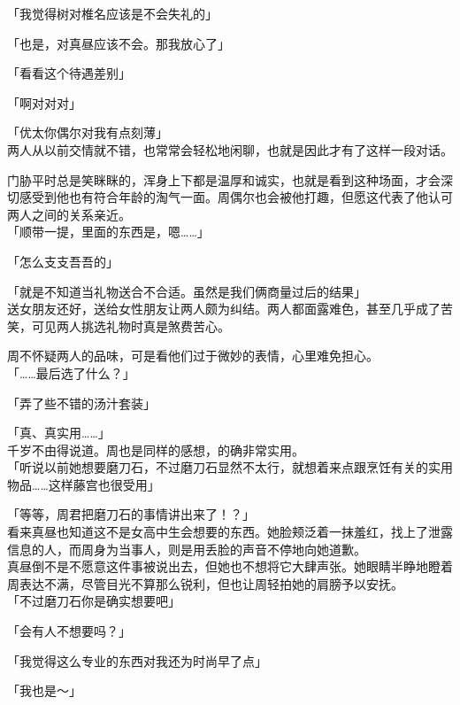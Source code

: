 「我觉得树对椎名应该是不会失礼的」

「也是，对真昼应该不会。那我放心了」

「看看这个待遇差别」

「啊对对对」

「优太你偶尔对我有点刻薄」\\

两人从以前交情就不错，也常常会轻松地闲聊，也就是因此才有了这样一段对话。

门胁平时总是笑眯眯的，浑身上下都是温厚和诚实，也就是看到这种场面，才会深切感受到他也有符合年龄的淘气一面。周偶尔也会被他打趣，但愿这代表了他认可两人之间的关系亲近。\\

「顺带一提，里面的东西是，嗯……」

「怎么支支吾吾的」

「就是不知道当礼物送合不合适。虽然是我们俩商量过后的结果」\\

送女朋友还好，送给女性朋友让两人颇为纠结。两人都面露难色，甚至几乎成了苦笑，可见两人挑选礼物时真是煞费苦心。

周不怀疑两人的品味，可是看他们过于微妙的表情，心里难免担心。\\

「……最后选了什么？」

「弄了些不错的汤汁套装」

「真、真实用……」\\

千岁不由得说道。周也是同样的感想，的确非常实用。\\

「听说以前她想要磨刀石，不过磨刀石显然不太行，就想着来点跟烹饪有关的实用物品……这样藤宫也很受用」

「等等，周君把磨刀石的事情讲出来了！？」\\

看来真昼也知道这不是女高中生会想要的东西。她脸颊泛着一抹羞红，找上了泄露信息的人，而周身为当事人，则是用丢脸的声音不停地向她道歉。\\

真昼倒不是不愿意这件事被说出去，但她也不想将它大肆声张。她眼睛半睁地瞪着周表达不满，尽管目光不算那么锐利，但也让周轻拍她的肩膀予以安抚。\\

「不过磨刀石你是确实想要吧」

「会有人不想要吗？」

「我觉得这么专业的东西对我还为时尚早了点」

「我也是～」

